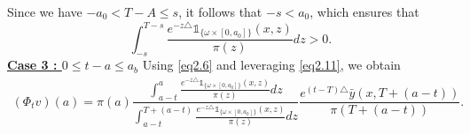 \documentclass[10pt, a4]{amsart}
\makeatletter
\theoremstyle{plain}
\theoremstyle{definition}
\theoremstyle{remark}
\renewenvironment{proof}[1][\proofname]{\par
  \pushQED{\qed}%
  \normalfont \topsep6\p@\@plus6\p@\relax
  \trivlist
  \item[\hskip\labelsep
        \itshape
    #1\ \ref{#1}.]\ignorespaces
}{%
  \popQED\endtrivlist\@endpefalse
}
\numberwithin{equation}{section}
\makeatother
\begin{document}
\begin{proof}[of Proposition \ref{pr2.3}]
Since we have \( -a_0 < T-A \leq s \), it follows that \( -s < a_0 \), which ensures that  
\begin{equation*}
\int_{-s}^{T-s} \frac{e^{-z\triangle} \mathds{1}_{\lbrace\omega\times[0,a_0]\rbrace}(x,z)}{\pi(z)} dz > 0.
\end{equation*}  
 \underline{\bf{Case 3 : $0\leq t-a\leq  a_b$}} 
Using \eqref{eq2.6} and leveraging \eqref{eq2.11}, we obtain  
\begin{align}\label{eq2.12}
(\Phi_t v)(a) = \pi(a) \dfrac{\displaystyle\int_{a-t}^{a} \frac{e^{-z\triangle} \mathds{1}_{\lbrace\omega\times[0,a_0]\rbrace}(x,z)}{\pi(z)} dz}{\displaystyle\int_{a-t}^{T+(a-t)} \frac{e^{-z\triangle} \mathds{1}_{\lbrace\omega\times[0,a_0]\rbrace}(x,z)}{\pi(z)} dz} \dfrac{e^{(t-T)\triangle} \bar{y}(x,T+(a-t))}{\pi(T+(a-t))}.
\end{align}  


\end{proof}
\end{document}
